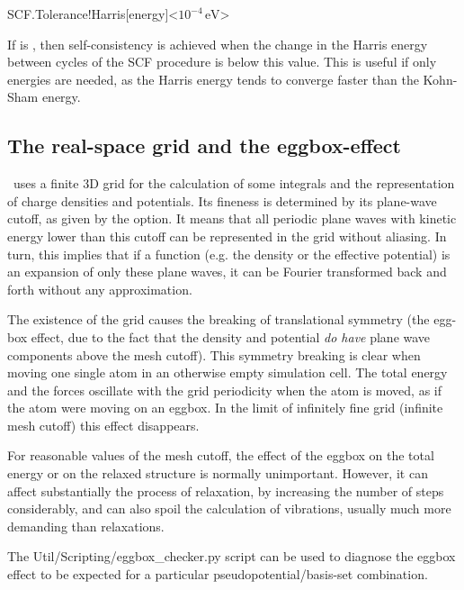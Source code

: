 \begin{fdfentry}{SCF.Tolerance!Harris}[energy]<$10^{-4}\,\mathrm{eV}$>

  If  is \fdftrue, then self-consistency is
  achieved when the change in the Harris energy between cycles of the
  SCF procedure is below this value. This is useful if only energies
  are needed, as the Harris energy tends to converge faster than the
  Kohn-Sham energy.
  
\end{fdfentry}



\vspace{5pt}
\subsection{The real-space grid and the eggbox-effect}

\siesta\ uses a finite 3D grid for the calculation of some
integrals and the representation of charge densities and potentials.
Its fineness is determined by its plane-wave cutoff, as
given by the  option. It means that all periodic
plane waves with kinetic energy lower than this cutoff 
can be represented in the grid without aliasing. In turn,
this implies that if a function (e.g. the density or the 
effective potential) is an expansion of
only these plane waves, it can be Fourier transformed
back and forth without any approximation.

The existence of the grid causes the breaking of translational
symmetry (the egg-box effect, due to the fact that the density
and potential \emph{do have} plane wave components above
the mesh cutoff).  This symmetry breaking is clear when
moving one single atom in an otherwise empty simulation cell. The
total energy and the forces oscillate with the grid periodicity when
the atom is moved, as if the atom were moving on an eggbox. In the
limit of infinitely fine grid (infinite mesh cutoff) this effect
disappears.

For reasonable values of the mesh cutoff, the effect of the eggbox
on the total energy or on the relaxed structure is normally unimportant.
However, it can affect substantially the process of relaxation, by
increasing the number of steps considerably, and can also spoil the
calculation of vibrations, usually much more demanding than relaxations.

The Util/Scripting/eggbox\_checker.py script can be used to diagnose
the eggbox effect to be expected for a particular
pseudopotential/basis-set combination.

